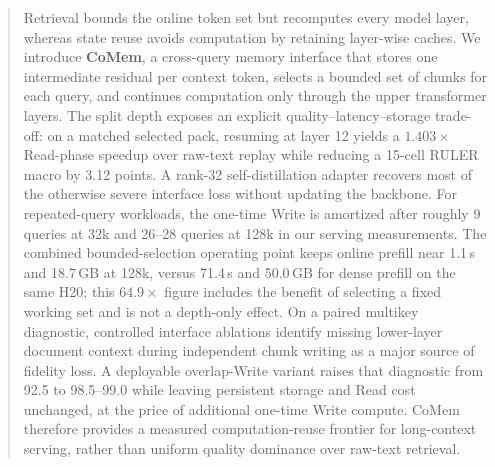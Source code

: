 \begin{abstract}
Retrieval bounds the online token set but recomputes every model layer, whereas
state reuse avoids computation by retaining layer-wise caches. We introduce
\textbf{CoMem}, a cross-query memory interface that stores one intermediate
residual per context token, selects a bounded set of chunks for each query, and
continues computation only through the upper transformer layers. The split
depth exposes an explicit quality--latency--storage trade-off: on a matched
selected pack, resuming at layer 12 yields a $1.403\times$ Read-phase speedup
over raw-text replay while reducing a 15-cell RULER macro by 3.12 points. A
rank-32 self-distillation adapter recovers most of the otherwise severe
interface loss without updating the backbone. For repeated-query workloads, the
one-time Write is amortized after roughly 9 queries at 32k and 26--28 queries at
128k in our serving measurements. The combined bounded-selection operating
point keeps online prefill near 1.1\,s and 18.7\,GB at 128k, versus 71.4\,s and
50.0\,GB for dense prefill on the same H20; this $64.9\times$ figure includes
the benefit of selecting a fixed working set and is not a depth-only effect.
On a paired multikey diagnostic, controlled interface ablations identify
missing lower-layer document context during independent chunk writing as a
major source of fidelity loss. A deployable overlap-Write variant raises that
diagnostic from 92.5 to
98.5--99.0 while leaving persistent storage and Read cost unchanged, at the
price of additional one-time Write compute. CoMem therefore provides a measured
computation-reuse frontier for long-context serving, rather than uniform quality
dominance over raw-text retrieval.
\end{abstract}
